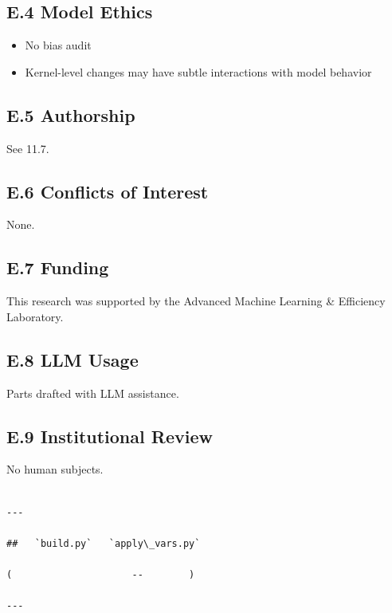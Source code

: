 \subsection{E.4 Model Ethics}

\begin{itemize}
\item No bias audit
\item Kernel-level changes may have subtle interactions with model behavior

\end{itemize}
\subsection{E.5 Authorship}

See  11.7.

\subsection{E.6 Conflicts of Interest}

None.

\subsection{E.7 Funding}

This research was supported by the Advanced Machine Learning \& Efficiency Laboratory.

\subsection{E.8 LLM Usage}

Parts drafted with LLM assistance.

\subsection{E.9 Institutional Review}

No human subjects.
\begin{lstlisting}

---

##   `build.py`   `apply\_vars.py`

(                     --        )

---
\end{lstlisting}